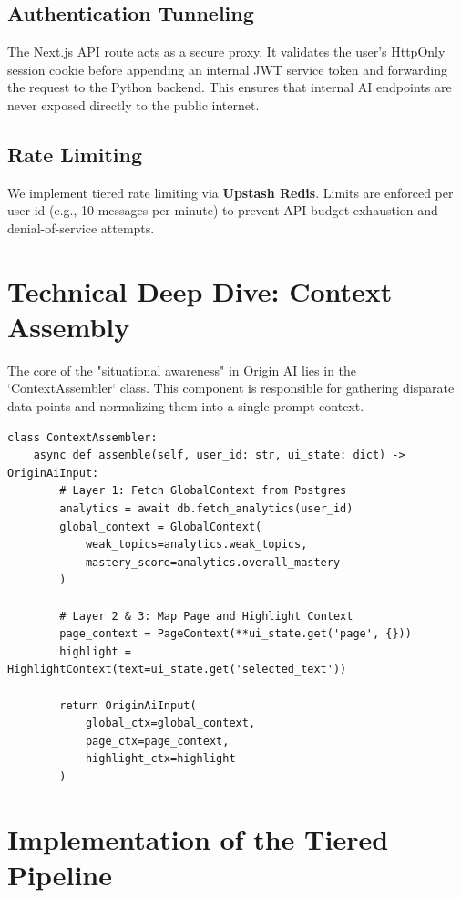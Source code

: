 \subsection{Authentication Tunneling}
The Next.js API route acts as a secure proxy. It validates the user's HttpOnly session cookie before appending an internal JWT service token and forwarding the request to the Python backend. This ensures that internal AI endpoints are never exposed directly to the public internet.

\subsection{Rate Limiting}
We implement tiered rate limiting via \textbf{Upstash Redis}. Limits are enforced per user-id (e.g., 10 messages per minute) to prevent API budget exhaustion and denial-of-service attempts.
\newpage
\section{Technical Deep Dive: Context Assembly}

The core of the "situational awareness" in Origin AI lies in the `ContextAssembler` class. This component is responsible for gathering disparate data points and normalizing them into a single prompt context.

\begin{verbatim}
class ContextAssembler:
    async def assemble(self, user_id: str, ui_state: dict) -> OriginAiInput:
        # Layer 1: Fetch GlobalContext from Postgres
        analytics = await db.fetch_analytics(user_id)
        global_context = GlobalContext(
            weak_topics=analytics.weak_topics,
            mastery_score=analytics.overall_mastery
        )
        
        # Layer 2 & 3: Map Page and Highlight Context
        page_context = PageContext(**ui_state.get('page', {}))
        highlight = HighlightContext(text=ui_state.get('selected_text'))
        
        return OriginAiInput(
            global_ctx=global_context,
            page_ctx=page_context,
            highlight_ctx=highlight
        )
\end{verbatim}

\section{Implementation of the Tiered Pipeline}

